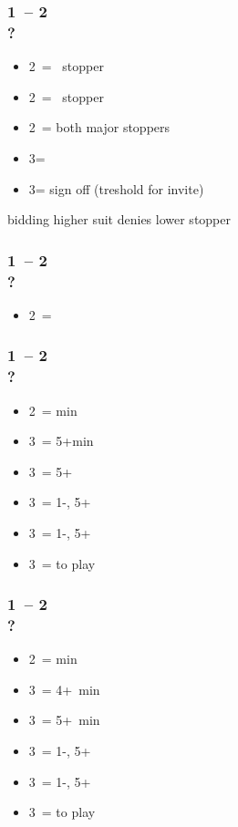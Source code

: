 \documentclass[12pt, a4paper]{article}
\begin{document}
\subsubsection*{1\diams\ -- 2\diams \\ ?}
\begin{itemize}
    \item 2\hearts\ = \hearts\ stopper
    \item 2\spades\ = \spades\ stopper
    \item 2\nt\ = both major stoppers
    \item 3\clubs = \nat
    \item 3\diams = sign off (treshold for invite)
\end{itemize}

bidding higher suit denies lower stopper

\subsubsection*{1\minor\ -- 2\hearts \\ ?}
\begin{itemize}
    \item 2\nt\ = \lsf
\end{itemize}

\subsubsection*{1\clubs\ -- 2\spades \\ ?}
\begin{itemize}
    \item 2\nt\ = \bal min
    \item 3\clubs\ = 5+\clubs min
    \item 3\diams\ = 5+\clubs \gf
    \item 3\hearts\ = 1-\hearts, 5+\clubs\ \gf
    \item 3\spades\ = 1-\spades, 5+\clubs\ \gf
    \item 3\nt\ = to play
\end{itemize}

\subsubsection*{1\diams\ -- 2\spades \\ ?}
\begin{itemize}
    \item 2\nt\ = \bal min
    \item 3\clubs\ = 4+\clubs\ min
    \item 3\diams\ = 5+\diams\ min
    \item 3\hearts\ = 1-\hearts, 5+\diams\ \gf
    \item 3\spades\ = 1-\spades, 5+\diams\ \gf
    \item 3\nt\ = to play
\end{itemize}
\end{document}
